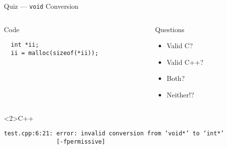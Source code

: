 \documentclass[presentation,aspectratio=169]{beamer}
\begin{document}
\begin{frame}[fragile,label={sec:org23c4234}]{Quiz — \texttt{void} Conversion}
 \begin{columns}
\begin{column}{0.48\columnwidth}
\begin{block}{Code}
\begin{verbatim}
  int *ii;
  ii = malloc(sizeof(*ii));
\end{verbatim}
\end{block}
\end{column}

\begin{column}{0.48\columnwidth}
\begin{block}{Questions}
\begin{itemize}
\item Valid C?
\item Valid C++?
\item Both?
\item Neither!?
\end{itemize}
\end{block}
\end{column}
\end{columns}

\begin{block}<2>{C++}
\begin{verbatim}
test.cpp:6:21: error: invalid conversion from ‘void*’ to ‘int*’
               [-fpermissive]
\end{verbatim}
\end{block}
\end{frame}

\end{document}
